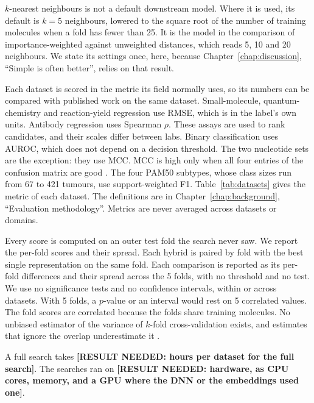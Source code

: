 $k$-nearest neighbours is not a default downstream model. Where it is used, its default is $k = 5$ neighbours, lowered to the square root of the number of training molecules when a fold has fewer than 25. It is the model in the comparison of importance-weighted against unweighted distances, which reads 5, 10 and 20 neighbours. We state its settings once, here, because Chapter~\ref{chap:discussion}, ``Simple is often better'', relies on that result.

Each dataset is scored in the metric its field normally uses, so its numbers can be compared with published work on the same dataset. Small-molecule, quantum-chemistry and reaction-yield regression use RMSE, which is in the label's own units. Antibody regression uses Spearman $\rho$. These assays are used to rank candidates, and their scales differ between labs. Binary classification uses AUROC, which does not depend on a decision threshold. The two nucleotide sets are the exception: they use MCC. MCC is high only when all four entries of the confusion matrix are good \citep{Chicco2020}. The four PAM50 subtypes, whose class sizes run from 67 to 421 tumours, use support-weighted F1. Table~\ref{tab:datasets} gives the metric of each dataset. The definitions are in Chapter~\ref{chap:background}, ``Evaluation methodology''. Metrics are never averaged across datasets or domains.

Every score is computed on an outer test fold the search never saw. We report the per-fold scores and their spread. Each hybrid is paired by fold with the best single representation on the same fold. Each comparison is reported as its per-fold differences and their spread across the 5 folds, with no threshold and no test. We use no significance tests and no confidence intervals, within or across datasets. With 5 folds, a $p$-value or an interval would rest on 5 correlated values. The fold scores are correlated because the folds share training molecules. No unbiased estimator of the variance of $k$-fold cross-validation exists, and estimates that ignore the overlap underestimate it \citep{Bengio2004}.

A full search takes \textbf{[RESULT NEEDED: hours per dataset for the full search]}. The searches ran on \textbf{[RESULT NEEDED: hardware, as CPU cores, memory, and a GPU where the DNN or the embeddings used one]}.




